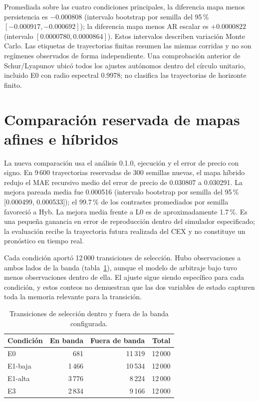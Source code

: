Promediada sobre las cuatro condiciones principales, la diferencia mapa menos persistencia es $-0.000808$ (intervalo bootstrap por semilla del 95\,\% $[-0.000917,-0.000692]$); la diferencia mapa menos AR escalar es $+0.0000822$ (intervalo $[0.0000780,0.0000864]$). Estos intervalos describen variación Monte Carlo. Las etiquetas de trayectorias finitas resumen las mismas corridas y no son regímenes observados de forma independiente. Una comprobación anterior de Schur/Lyapunov ubicó todos los ajustes autónomos dentro del círculo unitario, incluido E0 con radio espectral 0.9978; no clasifica las trayectorias de horizonte finito.

\section{Comparación reservada de mapas afines e híbridos}
\label{sec:hybrid-results}

La nueva comparación usa el análisis 0.1.0, ejecución \code{\HybridRunID} y el error de precio con signo. En 9\,600 trayectorias reservadas de 300 semillas nuevas, el mapa híbrido redujo el MAE recursivo medio del error de precio de 0.030807 a 0.030291. La mejora pareada media fue 0.000516 (intervalo bootstrap por semilla del 95\,\% [0.000499, 0.000533]); el 99.7\,\% de los contrastes promediados por semilla favoreció a Hyb. La mejora media frente a L0 es de aproximadamente 1.7\,\%. Es una pequeña ganancia en error de reproducción dentro del simulador especificado; la evaluación recibe la trayectoria futura realizada del CEX y no constituye un pronóstico en tiempo real.

Cada condición aportó 12\,000 transiciones de selección. Hubo observaciones a ambos lados de la banda (tabla~\ref{tab:hybrid-regimes}), aunque el modelo de arbitraje bajo tuvo menos observaciones dentro de ella. El ajuste sigue siendo específico para cada condición, y estos conteos no demuestran que las dos variables de estado capturen toda la memoria relevante para la transición.

\begin{table}[htbp]
\centering
\caption{Transiciones de selección dentro y fuera de la banda configurada.}
\label{tab:hybrid-regimes}
\small
\begin{tabular}{@{}lrrr@{}}
\toprule
Condición & En banda & Fuera de banda & Total \\
\midrule
E0 & 681 & 11\,319 & 12\,000 \\
E1-baja & 1\,466 & 10\,534 & 12\,000 \\
E1-alta & 3\,776 & 8\,224 & 12\,000 \\
E3 & 2\,834 & 9\,166 & 12\,000 \\
\bottomrule
\end{tabular}
\end{table}

